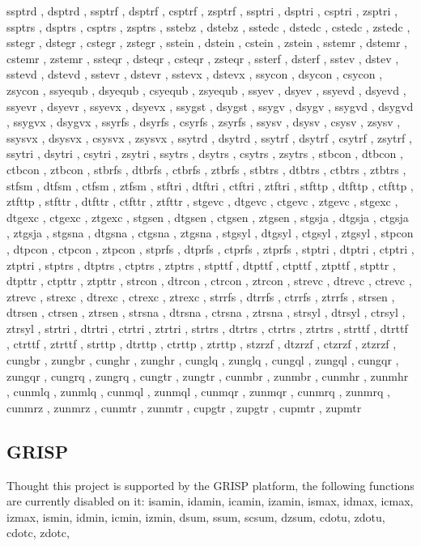 \documentclass{article}
\begin{document}
ssptrd , dsptrd , ssptrf , dsptrf , csptrf , zsptrf , ssptri , dsptri , csptri , zsptri , ssptrs , dsptrs , csptrs , zsptrs , sstebz , dstebz , sstedc , dstedc , cstedc , zstedc , sstegr , dstegr , cstegr , zstegr , sstein , dstein , cstein , zstein , sstemr , dstemr , cstemr , zstemr , ssteqr , dsteqr , csteqr , zsteqr , ssterf , dsterf , sstev , dstev , sstevd , dstevd , sstevr , dstevr , sstevx , dstevx , ssycon , dsycon , csycon , zsycon , ssyequb , dsyequb , csyequb , zsyequb , ssyev , dsyev , ssyevd , dsyevd , ssyevr , dsyevr , ssyevx , dsyevx , ssygst , dsygst , ssygv , dsygv , ssygvd , dsygvd , ssygvx , dsygvx , ssyrfs , dsyrfs , csyrfs , zsyrfs , ssysv , dsysv , csysv , zsysv , ssysvx , dsysvx , csysvx , zsysvx , ssytrd , dsytrd , ssytrf , dsytrf , csytrf , zsytrf , ssytri , dsytri , csytri , zsytri , ssytrs , dsytrs , csytrs , zsytrs , stbcon , dtbcon , ctbcon , ztbcon , stbrfs , dtbrfs , ctbrfs , ztbrfs , stbtrs , dtbtrs , ctbtrs , ztbtrs , stfsm , dtfsm , ctfsm , ztfsm , stftri , dtftri , ctftri , ztftri , stfttp , dtfttp , ctfttp , ztfttp , stfttr , dtfttr , ctfttr , ztfttr , stgevc , dtgevc , ctgevc , ztgevc , stgexc , dtgexc , ctgexc , ztgexc , stgsen , dtgsen , ctgsen , ztgsen , stgsja , dtgsja , ctgsja , ztgsja , stgsna , dtgsna , ctgsna , ztgsna , stgsyl , dtgsyl , ctgsyl , ztgsyl , stpcon , dtpcon , ctpcon , ztpcon , stprfs , dtprfs , ctprfs , ztprfs , stptri , dtptri , ctptri , ztptri , stptrs , dtptrs , ctptrs , ztptrs , stpttf , dtpttf , ctpttf , ztpttf , stpttr , dtpttr , ctpttr , ztpttr , strcon , dtrcon , ctrcon , ztrcon , strevc , dtrevc , ctrevc , ztrevc , strexc , dtrexc , ctrexc , ztrexc , strrfs , dtrrfs , ctrrfs , ztrrfs , strsen , dtrsen , ctrsen , ztrsen , strsna , dtrsna , ctrsna , ztrsna , strsyl , dtrsyl , ctrsyl , ztrsyl , strtri , dtrtri , ctrtri , ztrtri , strtrs , dtrtrs , ctrtrs , ztrtrs , strttf , dtrttf , ctrttf , ztrttf , strttp , dtrttp , ctrttp , ztrttp , stzrzf , dtzrzf , ctzrzf , ztzrzf , cungbr , zungbr , cunghr , zunghr , cunglq , zunglq , cungql , zungql , cungqr , zungqr , cungrq , zungrq , cungtr , zungtr , cunmbr , zunmbr , cunmhr , zunmhr , cunmlq , zunmlq , cunmql , zunmql , cunmqr , zunmqr , cunmrq , zunmrq , cunmrz , zunmrz , cunmtr , zunmtr , cupgtr , zupgtr , cupmtr , zupmtr 

\subsection{GRISP}
Thought this project is supported by the GRISP platform, the following functions are currently disabled on it:
isamin, idamin, icamin, izamin, ismax, idmax, icmax, izmax, ismin, idmin, icmin, izmin, dsum, ssum, scsum, dzsum, cdotu, zdotu, cdotc, zdotc, 
\end{document}
